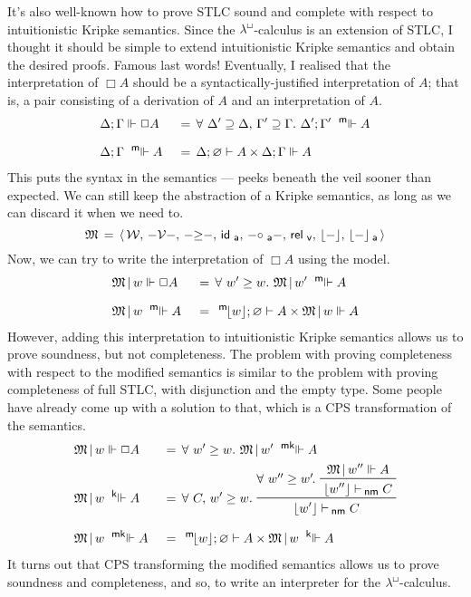 \documentclass{entcs}
\numberwithin{equation}{thm}
\newcommand{\lambdabox}{\lambda^{\mkern-1mu\sq\mkern-2mu}}
\newcommand{\binop}[1]{-\mathord{#1}-}
\newcommand{\tsf}[1]{\textsf{\upshape{#1}}}
\newcommand{\stsf}[1]{\tsf{\small{#1}}}
\renewcommand{\:}{\mathrel{:}}
\let\oldforall\forall
\renewcommand{\forall}{\oldforall\,}
\newcommand{\0}{\varnothing}
\renewcommand{\geq}{\mathrel{\supseteq}}
\newcommand{\sq}{\Box}
\renewcommand{\e}{\mathrel{\vdash}}
\newcommand{\enm}{\mathrel{\vdash_{\mkern-2mu\stsf{nm}}}}
\newcommand{\M}{\mathfrak{M}}
\newcommand{\W}{\mathcal{W}}
\newcommand{\V}{\mathrel{\mathcal{V}}}
\newcommand{\ida}{\operatorname{\tsf{id}_{\stsf{a}}}}
\newcommand{\compa}{\mathrel{\circ_{\stsf{a}}}}
\newcommand{\relv}{\operatorname{\tsf{rel}_{\stsf{v}}}}
\newcommand{\peek}[1]{\mathopen{\lfloor}{#1}\mathclose{\rfloor}}
\newcommand{\peeka}[1]{\mathopen{\lfloor}{#1}\mathclose{\rfloor_{\mkern-2mu\stsf{a}}}}
\newcommand{\mpeek}[1]{\mathopen{^{\stsf{m}\mkern-3mu}\lfloor}{#1}\mathclose{\rfloor}}
\newcommand{\ee}{\mathrel{\Vdash}}
\newcommand{\kee}{\mathrel{^{\stsf{k}\mkern-6mu}\Vdash}}
\newcommand{\mee}{\mathrel{^{\stsf{m}\mkern-6mu}\Vdash}}
\newcommand{\mkee}{\mathrel{^{\stsf{mk}\mkern-6mu}\Vdash}}
\begin{document}
It's also well-known how to prove STLC sound and complete with respect to intuitionistic Kripke semantics.  Since the $\lambdabox$-calculus is an extension of STLC, I thought it should be simple to extend intuitionistic Kripke semantics and obtain the desired proofs.  Famous last words!  Eventually, I realised that the interpretation of $\sq A$ should be a syntactically-justified interpretation of $A$; that is, a pair consisting of a derivation of $A$ and an interpretation of $A$.
\begin{alignat*}{2}
  & \Delta; \Gamma \ee \sq A \,&&=\, \forall \Delta' \geq \Delta,\,\Gamma' \geq \Gamma.\ \Delta'; \Gamma' \mee A\\[0.5\baselineskip]
  & \Delta; \Gamma \mee A    \,&&=\, \Delta; \0 \e A \times \Delta; \Gamma \ee A
\end{alignat*}
This puts the syntax in the semantics --- peeks beneath the veil sooner than expected.  We can still keep the abstraction of a Kripke semantics, as long as we can discard it when we need to.
  \[\M \,=\, \langle\,\W,\,\binop{\V},\,\binop{\ge},\,\ida,\,\binop{\compa},\,\relv,\,\peek{-},\,\peeka{-}\,\rangle\]
Now, we can try to write the interpretation of $\sq A$ using the model.
\begin{alignat*}{2}
  & \M\,|\,w \ee \sq A \,&&=\, \forall w' \ge w.\ \M\,|\,w' \mee A\\[0.5\baselineskip]
  & \M\,|\,w \mee A    \,&&=\, \mpeek{w}; \0 \e A \times \M\,|\,w \ee A
\end{alignat*}
However, adding this interpretation to intuitionistic Kripke semantics allows us to prove soundness, but not completeness.  The problem with proving completeness with respect to the modified semantics is similar to the problem with proving completeness of full STLC, with disjunction and the empty type.  Some people have already come up with a solution to that, which is a CPS transformation of the semantics.
\begin{alignat*}{2}
  & \M\,|\,w \ee \sq A \,&&=\, \forall w' \ge w.\ \M\,|\,w' \mkee A\\
  & \M\,|\,w \kee A    \,&&=\, \forall C,\,w' \ge w.\ \raisebox{-8pt}{\prftree{\raisebox{8pt}{$\forall w'' \ge w'\mkern-2mu.\ $}\prftree{\M\,|\,w'' \ee A}{\lfloor w'' \rfloor \enm C}}{\lfloor w' \rfloor \enm C}}\\[0.5\baselineskip]
  & \M\,|\,w \mkee A \,&&=\, \mpeek{w}; \0 \e A \times \M\,|\,w \kee A
\end{alignat*}
It turns out that CPS transforming the modified semantics allows us to prove soundness and completeness, and so, to write an interpreter for the $\lambdabox$-calculus.
\end{document}
